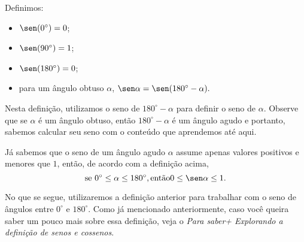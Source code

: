 Definimos:
\begin{itemize}[topsep=0pt, itemsep=0pt]
\item $\sen(0^\circ)= 0$;
\item $\sen(90^\circ)= 1$;
\item $\sen(180^\circ)= 0$;
\item para um ângulo obtuso $\alpha$, $\sen\alpha=\sen(180^\circ-\alpha).$
\end{itemize}

Nesta definição, utilizamos o seno de $180^\circ-\alpha$ para definir o seno de $\alpha$. Observe que se $\alpha$ é um ângulo obtuso, então $180^\circ-\alpha$ é um ângulo agudo e portanto, sabemos calcular seu seno com o conteúdo que aprendemos até aqui. 

\begin{observation}
Já sabemos que o seno de um ângulo agudo $\alpha$ assume apenas valores positivos e menores que $1$, então, de acordo com a definição acima,  
$$\text{se }0^\circ \leq\alpha \leq180^\circ, \text{então} 0\leq\sen\alpha\leq 1.$$
\end{observation}

No que se segue, utilizaremos a definição anterior para trabalhar com o seno de ângulos entre $0^\circ$ e $180^\circ$. Como já mencionado anteriormente, caso você queira saber um pouco mais sobre essa definição, veja o \textit{Para saber+ Explorando a definição de senos e cossenos}. 

